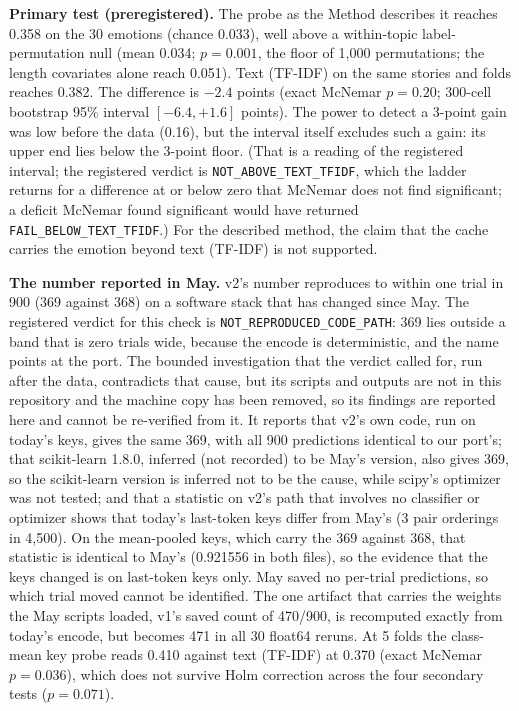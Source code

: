 \documentclass[11pt,a4paper]{article}
\begin{document}
\textbf{Primary test (preregistered).} The probe as the Method describes it reaches 0.358 on the 30 emotions (chance 0.033), well above a within-topic label-permutation null (mean 0.034; $p = 0.001$, the floor of 1{,}000 permutations; the length covariates alone reach 0.051). Text (TF-IDF) on the same stories and folds reaches 0.382. The difference is $-2.4$ points (exact McNemar $p = 0.20$; 300-cell bootstrap 95\% interval $[-6.4, +1.6]$ points). The power to detect a 3-point gain was low before the data (0.16), but the interval itself excludes such a gain: its upper end lies below the 3-point floor. (That is a reading of the registered interval; the registered verdict is \texttt{NOT\_ABOVE\_TEXT\_TFIDF}, which the ladder returns for a difference at or below zero that McNemar does not find significant; a deficit McNemar found significant would have returned \texttt{FAIL\_BELOW\_TEXT\_TFIDF}.) For the described method, the claim that the cache carries the emotion beyond text (TF-IDF) is not supported.

\textbf{The number reported in May.} v2's number reproduces to within one trial in 900 (369 against 368) on a software stack that has changed since May. The registered verdict for this check is \texttt{NOT\_REPRODUCED\_CODE\_PATH}: 369 lies outside a band that is zero trials wide, because the encode is deterministic, and the name points at the port. The bounded investigation that the verdict called for, run after the data, contradicts that cause, but its scripts and outputs are not in this repository and the machine copy has been removed, so its findings are reported here and cannot be re-verified from it. It reports that v2's own code, run on today's keys, gives the same 369, with all 900 predictions identical to our port's; that scikit-learn 1.8.0, inferred (not recorded) to be May's version, also gives 369, so the scikit-learn version is inferred not to be the cause, while scipy's optimizer was not tested; and that a statistic on v2's path that involves no classifier or optimizer shows that today's last-token keys differ from May's (3 pair orderings in 4{,}500). On the mean-pooled keys, which carry the 369 against 368, that statistic is identical to May's (0.921556 in both files), so the evidence that the keys changed is on last-token keys only. May saved no per-trial predictions, so which trial moved cannot be identified. The one artifact that carries the weights the May scripts loaded, v1's saved count of 470/900, is recomputed exactly from today's encode, but becomes 471 in all 30 float64 reruns. At 5 folds the class-mean key probe reads 0.410 against text (TF-IDF) at 0.370 (exact McNemar $p = 0.036$), which does not survive Holm correction across the four secondary tests ($p = 0.071$).
\end{document}
